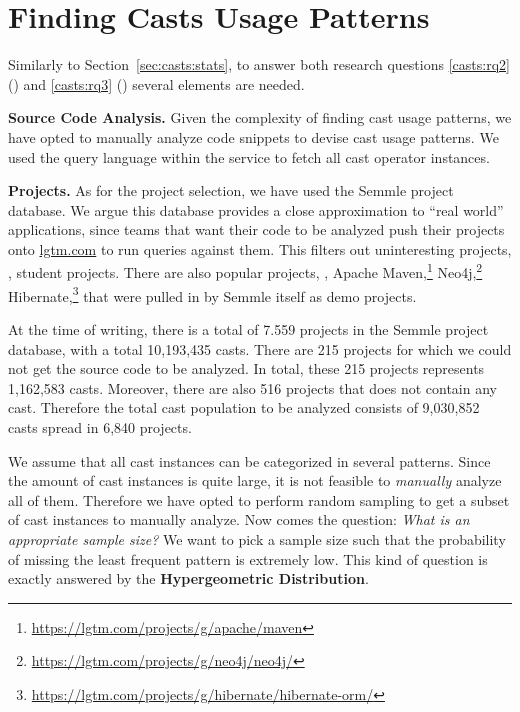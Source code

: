 \section{Finding Casts Usage Patterns}
\label{sec:casts:methodology}

Similarly to Section~\ref{sec:casts:stats}, to answer both research questions
\ref{casts:rq2} (\emph{\crqB}) and \ref{casts:rq3} (\emph{\crqC}) several elements are needed.

\textbf{Source Code Analysis.}
Given the complexity of finding cast usage patterns, we have opted to manually analyze code snippets to devise cast usage patterns.
We used the \ql{} query language within the \lgtm{} service to fetch all cast operator instances.

\textbf{Projects.}
As for the project selection, we have used the Semmle project database.
We argue this database provides a close approximation to ``real world'' applications, since teams that want their code to be analyzed push their projects onto \href{https://lgtm.com}{lgtm.com} to run queries against them.
This filters out uninteresting projects, \eg, student projects.
There are also popular projects, \eg,
Apache Maven,\footnote{\url{https://lgtm.com/projects/g/apache/maven}}
Neo4j,\footnote{\url{https://lgtm.com/projects/g/neo4j/neo4j/}}
Hibernate,\footnote{\url{https://lgtm.com/projects/g/hibernate/hibernate-orm/}}
that were pulled in by Semmle itself as demo projects.


At the time of writing, there is a total of 7.559 projects in the Semmle project database, with a total 10,193,435 casts.
There are 215 projects for which we could not get the source code to be analyzed.
In total, these 215 projects represents 1,162,583 casts.
Moreover, there are also 516 projects that does not contain any cast.
Therefore the total cast population to be analyzed consists of 9,030,852 casts spread in 6,840 projects.

We assume that all cast instances can be categorized in several patterns.
Since the amount of cast instances is quite large, it is not feasible to \emph{manually} analyze all of them.
Therefore we have opted to perform random sampling to get a subset of cast instances to manually analyze.
Now comes the question: \emph{What is an appropriate sample size?}
We want to pick a sample size such that the probability of missing the least frequent pattern is extremely low.
This kind of question is exactly answered by the \textbf{Hypergeometric Distribution}.

